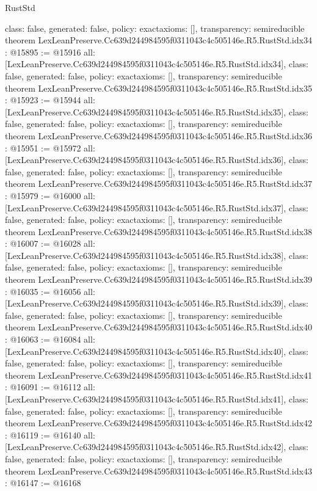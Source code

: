 \begin{lexlean}{RustStd}
\begin{coremodule}
{  class: false,
  generated: false,
  policy: exact{axioms: []},
  transparency: semireducible
}
theorem LexLeanPreserve.Cc639d244984595f0311043c4c505146e.R5.RustStd.idx34 : @15895 := @15916 {
  all: [LexLeanPreserve.Cc639d244984595f0311043c4c505146e.R5.RustStd.idx34],
  class: false,
  generated: false,
  policy: exact{axioms: []},
  transparency: semireducible
}
theorem LexLeanPreserve.Cc639d244984595f0311043c4c505146e.R5.RustStd.idx35 : @15923 := @15944 {
  all: [LexLeanPreserve.Cc639d244984595f0311043c4c505146e.R5.RustStd.idx35],
  class: false,
  generated: false,
  policy: exact{axioms: []},
  transparency: semireducible
}
theorem LexLeanPreserve.Cc639d244984595f0311043c4c505146e.R5.RustStd.idx36 : @15951 := @15972 {
  all: [LexLeanPreserve.Cc639d244984595f0311043c4c505146e.R5.RustStd.idx36],
  class: false,
  generated: false,
  policy: exact{axioms: []},
  transparency: semireducible
}
theorem LexLeanPreserve.Cc639d244984595f0311043c4c505146e.R5.RustStd.idx37 : @15979 := @16000 {
  all: [LexLeanPreserve.Cc639d244984595f0311043c4c505146e.R5.RustStd.idx37],
  class: false,
  generated: false,
  policy: exact{axioms: []},
  transparency: semireducible
}
theorem LexLeanPreserve.Cc639d244984595f0311043c4c505146e.R5.RustStd.idx38 : @16007 := @16028 {
  all: [LexLeanPreserve.Cc639d244984595f0311043c4c505146e.R5.RustStd.idx38],
  class: false,
  generated: false,
  policy: exact{axioms: []},
  transparency: semireducible
}
theorem LexLeanPreserve.Cc639d244984595f0311043c4c505146e.R5.RustStd.idx39 : @16035 := @16056 {
  all: [LexLeanPreserve.Cc639d244984595f0311043c4c505146e.R5.RustStd.idx39],
  class: false,
  generated: false,
  policy: exact{axioms: []},
  transparency: semireducible
}
theorem LexLeanPreserve.Cc639d244984595f0311043c4c505146e.R5.RustStd.idx40 : @16063 := @16084 {
  all: [LexLeanPreserve.Cc639d244984595f0311043c4c505146e.R5.RustStd.idx40],
  class: false,
  generated: false,
  policy: exact{axioms: []},
  transparency: semireducible
}
theorem LexLeanPreserve.Cc639d244984595f0311043c4c505146e.R5.RustStd.idx41 : @16091 := @16112 {
  all: [LexLeanPreserve.Cc639d244984595f0311043c4c505146e.R5.RustStd.idx41],
  class: false,
  generated: false,
  policy: exact{axioms: []},
  transparency: semireducible
}
theorem LexLeanPreserve.Cc639d244984595f0311043c4c505146e.R5.RustStd.idx42 : @16119 := @16140 {
  all: [LexLeanPreserve.Cc639d244984595f0311043c4c505146e.R5.RustStd.idx42],
  class: false,
  generated: false,
  policy: exact{axioms: []},
  transparency: semireducible
}
theorem LexLeanPreserve.Cc639d244984595f0311043c4c505146e.R5.RustStd.idx43 : @16147 := @16168 {
}
\end{coremodule}
\end{lexlean}
